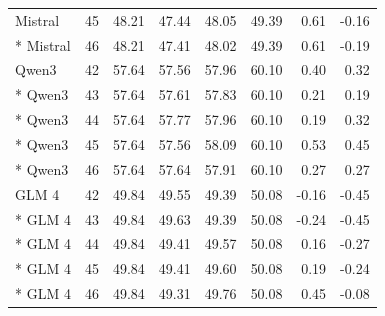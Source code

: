 {\begin{longtable}{lrrrrrrr}
Mistral & 45 & 48.21 & 47.44 & 48.05 & 49.39 & 0.61 & -0.16\\*
Mistral & 46 & 48.21 & 47.41 & 48.02 & 49.39 & 0.61 & -0.19\\
Qwen3 & 42 & 57.64 & 57.56 & 57.96 & 60.10 & 0.40 & 0.32\\*
Qwen3 & 43 & 57.64 & 57.61 & 57.83 & 60.10 & 0.21 & 0.19\\*
Qwen3 & 44 & 57.64 & 57.77 & 57.96 & 60.10 & 0.19 & 0.32\\*
Qwen3 & 45 & 57.64 & 57.56 & 58.09 & 60.10 & 0.53 & 0.45\\*
Qwen3 & 46 & 57.64 & 57.64 & 57.91 & 60.10 & 0.27 & 0.27\\
GLM 4 & 42 & 49.84 & 49.55 & 49.39 & 50.08 & -0.16 & -0.45\\*
GLM 4 & 43 & 49.84 & 49.63 & 49.39 & 50.08 & -0.24 & -0.45\\*
GLM 4 & 44 & 49.84 & 49.41 & 49.57 & 50.08 & 0.16 & -0.27\\*
GLM 4 & 45 & 49.84 & 49.41 & 49.60 & 50.08 & 0.19 & -0.24\\*
GLM 4 & 46 & 49.84 & 49.31 & 49.76 & 50.08 & 0.45 & -0.08\\
\end{longtable}}


